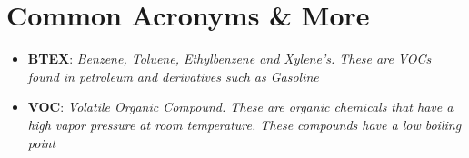 \documentclass{ituthesis}
\begin{document}
% 

%
%
%
%
%
%
%



\section{Common Acronyms \& More}

\begin{itemize}
	\item \textbf{BTEX}: \textit{Benzene, Toluene, Ethylbenzene and Xylene's. These are VOCs found in petroleum and derivatives such as Gasoline}
	\item \textbf{VOC}: \textit{Volatile Organic Compound. These are organic chemicals that have a high vapor pressure at room temperature. These compounds have a low boiling point}
\end{itemize}


\end{document}
